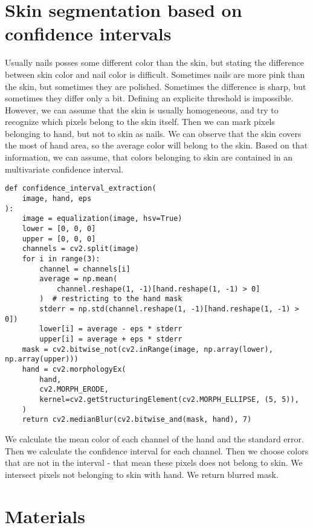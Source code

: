 \documentclass{article} %
\newcounter{late}
\begin{document}
\section{Skin segmentation based on confidence intervals}

Usually nails posses some different color than the skin, but stating the difference between skin color and nail color is difficult. Sometimes nails are more pink than the skin, but sometimes they are polished. Sometimes the difference is sharp, but sometimes they differ only a bit. Defining an explicite threshold is impossible. However, we can assume that the skin is usually homogeneous, and try to recognize which pixels belong to the skin itself. Then we can mark pixels belonging to hand, but not to skin as nails.
We can observe that the skin covers the most of hand area, so the average color will belong to the skin. Based on that information, we can assume, that colors belonging to skin are contained in an multivariate confidence interval.


\begin{lstlisting}
def confidence_interval_extraction(
    image, hand, eps
):
    image = equalization(image, hsv=True)
    lower = [0, 0, 0]
    upper = [0, 0, 0]
    channels = cv2.split(image)
    for i in range(3):
        channel = channels[i]
        average = np.mean(
            channel.reshape(1, -1)[hand.reshape(1, -1) > 0]
        )  # restricting to the hand mask
        stderr = np.std(channel.reshape(1, -1)[hand.reshape(1, -1) > 0])
        lower[i] = average - eps * stderr
        upper[i] = average + eps * stderr
    mask = cv2.bitwise_not(cv2.inRange(image, np.array(lower), np.array(upper)))
    hand = cv2.morphologyEx(
        hand,
        cv2.MORPH_ERODE,
        kernel=cv2.getStructuringElement(cv2.MORPH_ELLIPSE, (5, 5)),
    )
    return cv2.medianBlur(cv2.bitwise_and(mask, hand), 7)
\end{lstlisting}
We calculate the mean color of each channel of the hand and the standard error. Then we calculate the confidence interval for each channel.
Then we choose colors that are not in the interval - that mean these pixels does not belong to skin. We intersect pixels not belonging to skin with hand. We return blurred mask.



\section {Materials}
\end{document}
